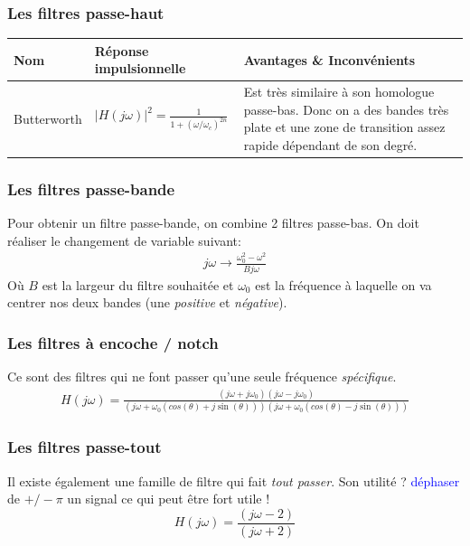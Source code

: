 \documentclass{report}
\begin{document}
\subsubsection{Les filtres passe-haut}
\begin{center}
\begin{tabular}{|m{3cm}|m{5cm}|m{7cm}|}
\hline
\cellcolor[gray]{0.8} Nom &\cellcolor[gray]{0.8} Réponse impulsionnelle & \cellcolor[gray]{0.8} Avantages \& Inconvénients\\
\hline
Butterworth & $|H(j\omega)|^2 = \frac{1}{1+(\omega/\omega_c)^{2n}}$ & Est très similaire à son homologue passe-bas. Donc on a des bandes très plate et une zone de transition assez rapide dépendant de son degré.\\
\hline

\end{tabular}
\end{center}

\subsubsection{Les filtres passe-bande}
Pour obtenir un filtre passe-bande, on combine 2 filtres passe-bas. On doit réaliser le changement de variable suivant:
\begin{align*}
j\omega \rightarrow \frac{\omega_0^2 - \omega^2}{Bj\omega}
\end{align*}
Où $B$ est la largeur du filtre souhaitée et $\omega_0$ est la fréquence à laquelle on va centrer nos deux bandes (une \textit{positive} et \textit{négative}).

\subsubsection{Les filtres à encoche / notch}
Ce sont des filtres qui ne font passer qu'une seule fréquence \textit{spécifique}.
\begin{align}
H(j\omega) = \frac{(j\omega + j\omega_0)(j\omega - j\omega_0)}{(j \omega + \omega_0(cos(\theta) + j\sin(\theta)))(j \omega + \omega_0(cos(\theta) -j\sin(\theta))) }
\end{align}

\subsubsection{Les filtres passe-tout}
Il existe également une famille de filtre qui fait \textit{tout passer}. Son utilité ? \textcolor{blue}{déphaser} de $+/- \pi$ un signal ce qui peut être fort utile !
\begin{equation}
H(j\omega) = \frac{(j\omega - 2)}{(j\omega + 2)}
\end{equation}
\end{document}
